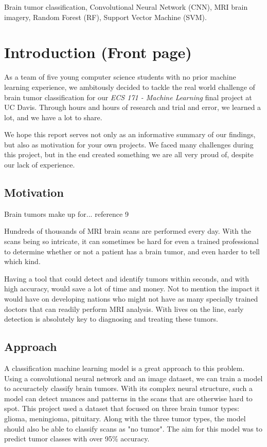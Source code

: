 \documentclass[conference]{IEEEtran}
\begin{document}
\begin{IEEEkeywords}
Brain tumor classification, Convolutional Neural Network (CNN), MRI brain imagery, Random Forest (RF), Support Vector Machine (SVM). 
\end{IEEEkeywords}

\large 
\section{\large Introduction (Front page)}
As a team of five young computer science students with no prior machine learning experience, we ambitously decided to tackle the real world challenge of brain tumor classification for our \textit{ECS 171 - Machine Learning} final project at UC Davis. Through hours and hours of research and trial and error, we learned a lot, and we have a lot to share. 

We hope this report serves not only as an informative summary of our findings, but also as motivation for your own projects. We faced many challenges during this project, but in the end created something we are all very proud of, despite our lack of experience.

\subsection{\large Motivation}

Brain tumors make up for... reference 9%

Hundreds of thousands of MRI brain scans are performed every day. With the scans being so intricate, it can sometimes be hard for even a trained professional to determine whether or not a patient has a brain tumor, and even harder to tell which kind. 

Having a tool that could detect and identify tumors within seconds, and with high accuracy, would save a lot of time and money. Not to mention the impact it would have on developing nations who might not have as many specially trained doctors that can readily perform MRI analysis. With lives on the line, early detection is absolutely key to diagnosing and treating these tumors.

\subsection{\large Approach}
A classification machine learning model is a great approach to this problem. Using a convolutional neural network and an image dataset, we can train a model to accuractely classify brain tumors. With its complex neural structure, such a model can detect nuances and patterns in the scans that are otherwise hard to spot. This project used a dataset that focused on three brain tumor types: glioma, meningioma, pituitary. Along with the three tumor types, the model should also be able to classify scans as "no tumor". The aim for this model was to predict tumor classes with over 95\% accuracy.
\end{document}
